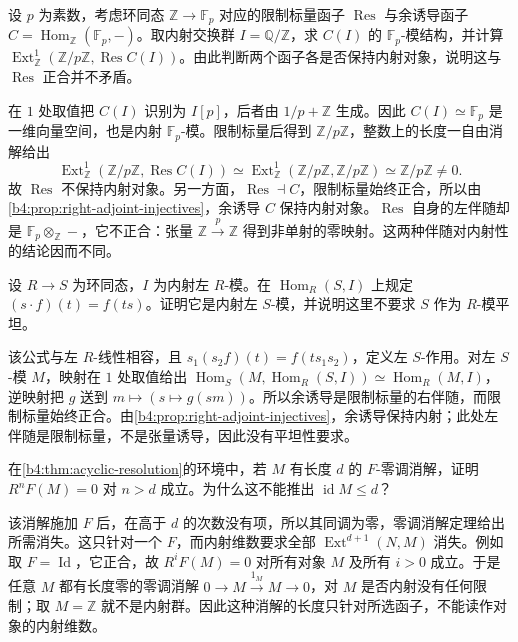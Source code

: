 \begin{exercise}\label{b4:ex:10-composite-image-condition}
	设 \(p\) 为素数，考虑环同态 \(\mathbb Z\to\mathbb F_p\) 对应的限制标量函子 \(\operatorname{Res}\) 与余诱导函子 \(C=\operatorname{Hom}_{\mathbb Z}(\mathbb F_p,-)\)。取内射交换群 \(I=\mathbb Q/\mathbb Z\)，求 \(C(I)\) 的 \(\mathbb F_p\)-模结构，并计算 \(\operatorname{Ext}_{\mathbb Z}^1(\mathbb Z/p\mathbb Z,\operatorname{Res}C(I))\)。由此判断两个函子各是否保持内射对象，说明这与 \(\operatorname{Res}\) 正合并不矛盾。
\end{exercise}
\begin{solution}
	在 \(1\) 处取值把 \(C(I)\) 识别为 \(I[p]\)，后者由 \(1/p+\mathbb Z\) 生成。因此 \(C(I)\simeq\mathbb F_p\) 是一维向量空间，也是内射 \(\mathbb F_p\)-模。限制标量后得到 \(\mathbb Z/p\mathbb Z\)，整数上的长度一自由消解给出
	\[
		\operatorname{Ext}_{\mathbb Z}^1(\mathbb Z/p\mathbb Z,\operatorname{Res}C(I)) \simeq\operatorname{Ext}_{\mathbb Z}^1(\mathbb Z/p\mathbb Z,\mathbb Z/p\mathbb Z) \simeq\mathbb Z/p\mathbb Z\ne0.
	\]
	故 \(\operatorname{Res}\) 不保持内射对象。另一方面，\(\operatorname{Res}\dashv C\)，限制标量始终正合，所以由\cref{b4:prop:right-adjoint-injectives}，余诱导 \(C\) 保持内射对象。\(\operatorname{Res}\) 自身的左伴随却是 \(\mathbb F_p\otimes_{\mathbb Z}-\)，它不正合：张量 \(\mathbb Z\xrightarrow{p}\mathbb Z\) 得到非单射的零映射。这两种伴随对内射性的结论因而不同。
\end{solution}

\begin{exercise}\label{b4:ex:10-coinduction-injective}
	设 \(R\to S\) 为环同态，\(I\) 为内射左 \(R\)-模。在 \(\operatorname{Hom}_R(S,I)\) 上规定 \((s\cdot f)(t)=f(ts)\)。证明它是内射左 \(S\)-模，并说明这里不要求 \(S\) 作为 \(R\)-模平坦。
\end{exercise}
\begin{solution}
	该公式与左 \(R\)-线性相容，且 \(s_1(s_2f)(t)=f(ts_1s_2)\)，定义左 \(S\)-作用。对左 \(S\)-模 \(M\)，映射在 \(1\) 处取值给出 \(\operatorname{Hom}_S(M,\operatorname{Hom}_R(S,I))\simeq\operatorname{Hom}_R(M,I)\)，逆映射把 \(g\) 送到 \(m\mapsto(s\mapsto g(sm))\)。所以余诱导是限制标量的右伴随，而限制标量始终正合。由\cref{b4:prop:right-adjoint-injectives}，余诱导保持内射；此处左伴随是限制标量，不是张量诱导，因此没有平坦性要求。
\end{solution}

\begin{exercise}\label{b4:ex:10-finite-acyclic-length}
	在\cref{b4:thm:acyclic-resolution}的环境中，若 \(M\) 有长度 \(d\) 的 \(F\)-零调消解，证明 \(R^nF(M)=0\) 对 \(n>d\) 成立。为什么这不能推出 \(\operatorname{id}M\le d\)？
\end{exercise}
\begin{solution}
	该消解施加 \(F\) 后，在高于 \(d\) 的次数没有项，所以其同调为零，零调消解定理给出所需消失。这只针对一个 \(F\)，而内射维数要求全部 \(\operatorname{Ext}^{d+1}(N,M)\) 消失。例如取 \(F=\operatorname{Id}\)，它正合，故 \(R^iF(M)=0\) 对所有对象 \(M\) 及所有 \(i>0\) 成立。于是任意 \(M\) 都有长度零的零调消解 \(0\to M\xrightarrow{1_M}M\to0\)，对 \(M\) 是否内射没有任何限制；取 \(M=\mathbb Z\) 就不是内射群。因此这种消解的长度只针对所选函子，不能读作对象的内射维数。
\end{solution}

